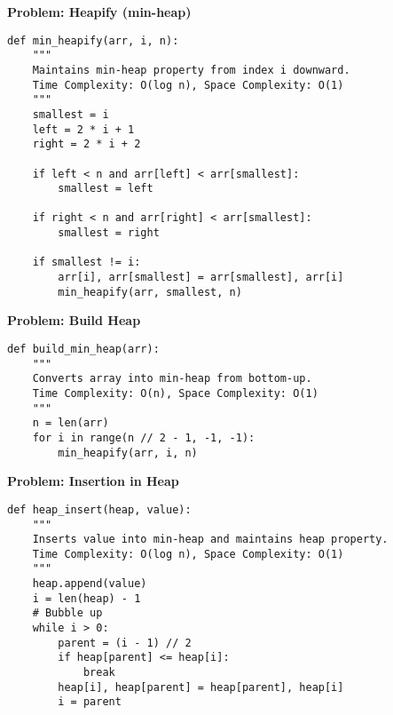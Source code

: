 % 
% 
\noindent\textbf{Problem: Heapify (min-heap)}
\begin{verbatim}
def min_heapify(arr, i, n):
    """
    Maintains min-heap property from index i downward.
    Time Complexity: O(log n), Space Complexity: O(1)
    """
    smallest = i
    left = 2 * i + 1
    right = 2 * i + 2
    
    if left < n and arr[left] < arr[smallest]:
        smallest = left
        
    if right < n and arr[right] < arr[smallest]:
        smallest = right
        
    if smallest != i:
        arr[i], arr[smallest] = arr[smallest], arr[i]
        min_heapify(arr, smallest, n)
\end{verbatim}

\noindent\textbf{Problem: Build Heap}
\begin{verbatim}
def build_min_heap(arr):
    """
    Converts array into min-heap from bottom-up.
    Time Complexity: O(n), Space Complexity: O(1)
    """
    n = len(arr)
    for i in range(n // 2 - 1, -1, -1):
        min_heapify(arr, i, n)
\end{verbatim}

\noindent\textbf{Problem: Insertion in Heap}
\begin{verbatim}
def heap_insert(heap, value):
    """
    Inserts value into min-heap and maintains heap property.
    Time Complexity: O(log n), Space Complexity: O(1)
    """
    heap.append(value)
    i = len(heap) - 1
    # Bubble up
    while i > 0:
        parent = (i - 1) // 2
        if heap[parent] <= heap[i]:
            break
        heap[i], heap[parent] = heap[parent], heap[i]
        i = parent
\end{verbatim}

